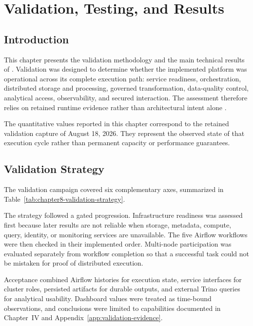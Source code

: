 \chapter{Validation, Testing, and Results}

\section{Introduction}
This chapter presents the validation methodology and the main technical results of \projectname{}. Validation was designed to determine whether the implemented platform was operational across its complete execution path: service readiness, orchestration, distributed storage and processing, governed transformation, data-quality control, analytical access, observability, and secured interaction. The assessment therefore relies on retained runtime evidence rather than architectural intent alone \cite{kleppmann2017ddia,apache_airflow_docs,prometheus_docs}.

The quantitative values reported in this chapter correspond to the retained validation capture of August 18, 2026. They represent the observed state of that execution cycle rather than permanent capacity or performance guarantees.

\section{Validation Strategy}
The validation campaign covered six complementary axes, summarized in Table~\ref{tab:chapter8-validation-strategy}.

The strategy followed a gated progression. Infrastructure readiness was assessed first because later results are not reliable when storage, metadata, compute, query, identity, or monitoring services are unavailable. The five Airflow workflows were then checked in their implemented order. Multi-node participation was evaluated separately from workflow completion so that a successful task could not be mistaken for proof of distributed execution.

Acceptance combined Airflow histories for execution state, service interfaces for cluster roles, persisted artifacts for durable outputs, and external Trino queries for analytical usability. Dashboard values were treated as time-bound observations, and conclusions were limited to capabilities documented in Chapter~IV and Appendix~\ref{app:validation-evidence}.

